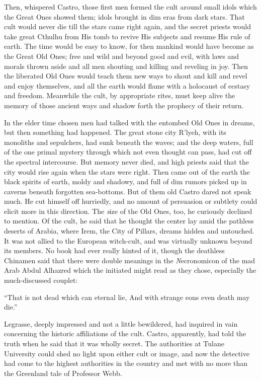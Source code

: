 Then, whispered Castro, those first men formed the cult around small idols which the Great Ones showed them; idols brought in dim eras from dark stars. That cult would never die till the stars came right again, and the secret priests would take great Cthulhu from His tomb to revive His subjects and resume His rule of earth. The time would be easy to know, for then mankind would have become as the Great Old Ones; free and wild and beyond good and evil, with laws and morals thrown aside and all men shouting and killing and reveling in joy. Then the liberated Old Ones would teach them new ways to shout and kill and revel and enjoy themselves, and all the earth would flame with a holocaust of ecstasy and freedom. Meanwhile the cult, by appropriate rites, must keep alive the memory of those ancient ways and shadow forth the prophecy of their return.

In the elder time chosen men had talked with the entombed Old Ones in dreams, but then something had happened. The great stone city R’lyeh, with its monoliths and sepulchers, had sunk beneath the waves; and the deep waters, full of the one primal mystery through which not even thought can pass, had cut off the spectral intercourse. But memory never died, and high priests said that the city would rise again when the stars were right. Then came out of the earth the black spirits of earth, moldy and shadowy, and full of dim rumors picked up in caverns beneath forgotten sea-bottoms. But of them old Castro dared not speak much. He cut himself off hurriedly, and no amount of persuasion or subtlety could elicit more in this direction. The {\emph size} of the Old Ones, too, he curiously declined to mention. Of the cult, he said that he thought the center lay amid the pathless deserts of Arabia, where Irem, the City of Pillars, dreams hidden and untouched. It was not allied to the European witch-cult, and was virtually unknown beyond its members. No book had ever really hinted of it, though the deathless Chinamen said that there were double meanings in the {\emph Necronomicon} of the mad Arab Abdul Alhazred which the initiated might read as they chose, especially the much-discussed couplet:

\beginblockquote
{“That is not dead which can eternal lie,}\break
{And with strange eons even death may die.”}
\endblockquote

Legrasse, deeply impressed and not a little bewildered, had inquired in vain concerning the historic affiliations of the cult. Castro, apparently, had told the truth when he said that it was wholly secret. The authorities at Tulane University could shed no light upon either cult or image, and now the detective had come to the highest authorities in the country and met with no more than the Greenland tale of Professor Webb.

